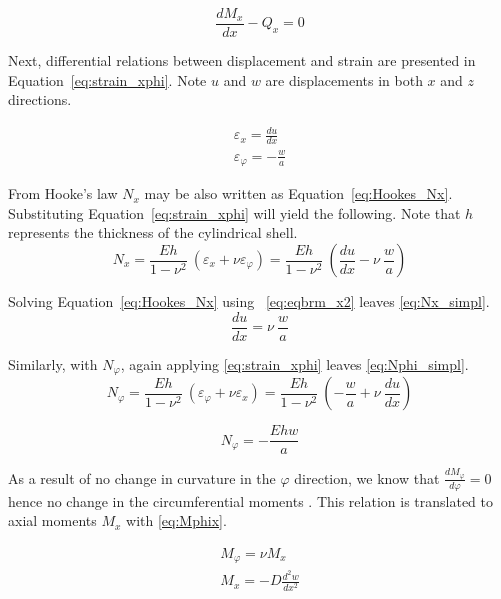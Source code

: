 \begin{equation}
	\label{eq:eqbrm_y2}
	\frac{dM_x}{dx}- Q_x= 0
\end{equation} 

Next, differential relations between displacement and strain are presented in Equation~\ref{eq:strain_xphi}. Note $u$ and $w$ are displacements in both $x$ and $z$ directions.

\begin{equation}
	\label{eq:strain_xphi}
	\begin{aligned}
		\varepsilon_x = \frac{du}{dx}      \\
		\varepsilon_\varphi = -\frac{w}{a} 
	\end{aligned}
\end{equation}

From Hooke's law $N_x$ may be also written as Equation~\ref{eq:Hookes_Nx}. Substituting Equation~\ref{eq:strain_xphi} will yield the following. Note that $h$ represents the thickness of the cylindrical shell.
\begin{equation}
	\label{eq:Hookes_Nx}
	N_x = \frac{Eh}{1-\nu^2}\ \left( \varepsilon_x + \nu \varepsilon_\varphi \right) =  \frac{Eh}{1-\nu^2}\ \left( \frac{du}{dx} -\nu \ \frac{w}{a} \right)
\end{equation} 

Solving Equation~\ref{eq:Hookes_Nx} using ~\ref{eq:eqbrm_x2} leaves \ref{eq:Nx_simpl}.
\begin{equation}
	\label{eq:Nx_simpl}
	\frac{du}{dx} =  \nu \ \frac{w}{a}
\end{equation} 

Similarly, with $N_\varphi$, again applying \ref{eq:strain_xphi} leaves \ref{eq:Nphi_simpl}.
\begin{equation}
	\label{eq:Hookes_Nphi}
	N_\varphi = \frac{Eh}{1-\nu^2}\ \left( \varepsilon_\varphi + \nu \varepsilon_x \right) = \frac{Eh}{1-\nu^2}\  \left( -\frac{w}{a}+\nu \ \frac{du}{dx} \right)
\end{equation} 

\begin{equation}
	\label{eq:Nphi_simpl}
	N_\varphi = - \frac{Ehw}{a}
\end{equation}

As a result of no change in curvature in the $\varphi$ direction, we know that $\frac{dM_\varphi}{d\varphi}= 0$ hence no change in the circumferential moments \cite{timoshenko1959theory}. This relation is translated to axial moments $M_x$ with \ref{eq:Mphix}.

\begin{equation}
	\label{eq:Mphix}
	\begin{aligned}
		M_\varphi = \nu M_x        \\
		M_x = -D \frac{d^2w}{dx^2} 
	\end{aligned}
\end{equation}

